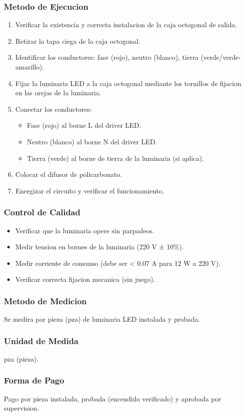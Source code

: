 \subsubsection{Metodo de Ejecucion}

\begin{enumerate}
  \item Verificar la existencia y correcta instalacion de la caja octogonal de salida.
  \item Retirar la tapa ciega de la caja octogonal.
  \item Identificar los conductores: fase (rojo), neutro (blanco), tierra (verde/verde-amarillo).
  \item Fijar la luminaria LED a la caja octogonal mediante los tornillos de fijacion en las orejas de la luminaria.
  \item Conectar los conductores:
  \begin{itemize}
    \item Fase (rojo) al borne L del driver LED.
    \item Neutro (blanco) al borne N del driver LED.
    \item Tierra (verde) al borne de tierra de la luminaria (si aplica).
  \end{itemize}
  \item Colocar el difusor de policarbonato.
  \item Energizar el circuito y verificar el funcionamiento.
\end{enumerate}

\subsubsection{Control de Calidad}

\begin{itemize}
  \item Verificar que la luminaria opere sin parpadeos.
  \item Medir tension en bornes de la luminaria (220 V ± 10\%).
  \item Medir corriente de consumo (debe ser < 0.07 A para 12 W a 220 V).
  \item Verificar correcta fijacion mecanica (sin juego).
\end{itemize}

\subsubsection{Metodo de Medicion}

Se medira por pieza (pza) de luminaria LED instalada y probada.

\subsubsection{Unidad de Medida}

pza (pieza).

\subsubsection{Forma de Pago}

Pago por pieza instalada, probada (encendido verificado) y aprobada por supervision.
